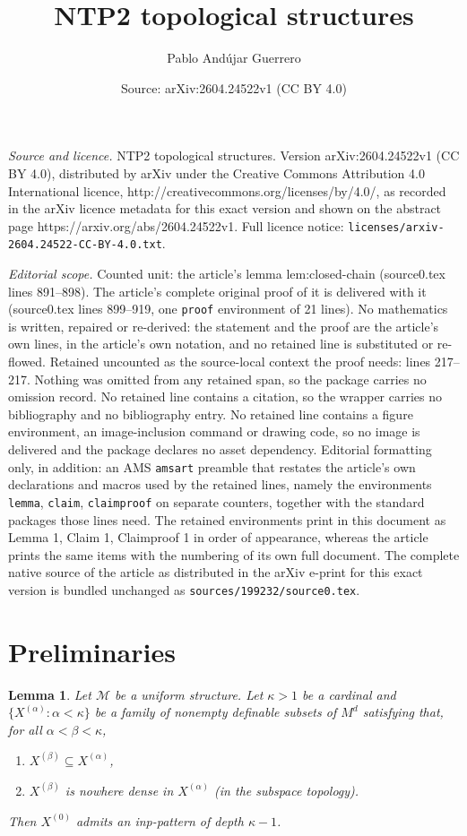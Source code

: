 \documentclass[10pt,a4paper]{amsart}
\title{NTP2 topological structures}
\author{Pablo And\'ujar Guerrero}
\date{Source: arXiv:2604.24522v1 (CC BY 4.0)}
\newtheorem{lemma}{Lemma}
\newcommand{\Mm}{\mathcal{M}}
\newcommand{\X}[1]{X^{(#1)}}
\begin{document}
\maketitle

\noindent\emph{Source and licence.} NTP2 topological structures. Version arXiv:2604.24522v1 (CC BY 4.0), distributed by arXiv under the Creative Commons Attribution 4.0 International licence, http://creativecommons.org/licenses/by/4.0/, as recorded in the arXiv licence metadata for this exact version and shown on the abstract page https://arxiv.org/abs/2604.24522v1. Full licence notice: \texttt{licenses/arxiv-2604.24522-CC-BY-4.0.txt}.\par\smallskip

\noindent\textit{Editorial scope.} Counted unit: the article's lemma lem:closed-chain (source0.tex lines 891--898). The article's complete original proof of it is delivered with it (source0.tex lines 899--919, one \texttt{proof} environment of 21 lines). No mathematics is written, repaired or re-derived: the statement and the proof are the article's own lines, in the article's own notation, and no retained line is substituted or re-flowed.  Retained uncounted as the source-local context the proof needs: lines 217--217.  Nothing was omitted from any retained span, so the package carries no omission record.  No retained line contains a citation, so the wrapper carries no bibliography and no bibliography entry.  No retained line contains a figure environment, an image-inclusion command or drawing code, so no image is delivered and the package declares no asset dependency.  Editorial formatting only, in addition: an AMS \texttt{amsart} preamble that restates the article's own declarations and macros used by the retained lines, namely the environments \texttt{lemma}, \texttt{claim}, \texttt{claimproof} on separate counters, together with the standard packages those lines need.  The retained environments print in this document as Lemma 1, Claim 1, Claimproof 1 in order of appearance, whereas the article prints the same items with the numbering of its own full document.  The complete native source of the article as distributed in the arXiv e-print for this exact version is bundled unchanged as \texttt{sources/199232/source0.tex}.
\section{Preliminaries} \label{sec:prelim}

\begin{lemma}\label{lem:closed-chain}
Let $\Mm$ be a uniform structure. Let $\kappa>1$ be a cardinal and $\{ \X{\alpha} : \alpha < \kappa\}$ be a family of nonempty definable subsets of $M^d$ satisfying that, for all $\alpha < \beta < \kappa$,
\begin{enumerate}
    \item $\X{\beta} \subseteq \X{\alpha}$,
    \item $\X{\beta}$ is nowhere dense in $\X{\alpha}$ (in the subspace topology).
\end{enumerate}
Then $\X{0}$ admits an inp-pattern of depth $\kappa-1$. 
\end{lemma}
\end{document}
